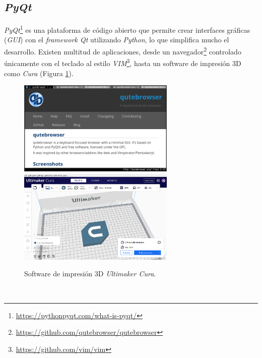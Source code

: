 \subsection{\textit{PyQt}}
\label{subsection:pyqt}
\textit{PyQt}\footnote{\url{https://pythonpyqt.com/what-is-pyqt/}} es una plataforma de código abierto que permite crear interfaces gráficas (\textit{GUI}) con el \textit{framework Qt} utilizando \textit{Python}, lo que simplifica mucho el desarrollo. Existen multitud de aplicaciones, desde un navegador\footnote{\url{https://github.com/qutebrowser/qutebrowser}} controlado únicamente con el teclado al estilo \textit{VIM}\footnote{\url{https://github.com/vim/vim}}, hasta un software de impresión 3D como \textit{Cura} (Figura \ref{fig:cura}).\\
\begin{figure} [h!]
	\begin{center}
		\includegraphics[width=7.5cm]{figs/qutebrowser}\hspace{0.1cm}\includegraphics[width=7.5cm]{figs/cura}
	\end{center}
	\caption{Software de impresión 3D \textit{Ultimaker Cura}.}
	\label{fig:cura}
\end{figure}\
